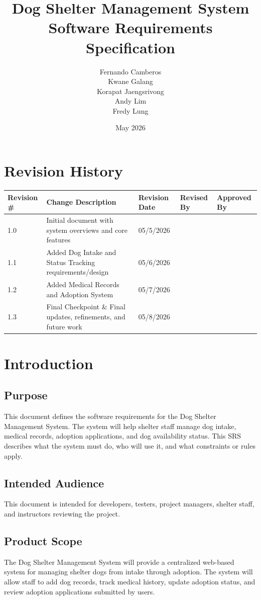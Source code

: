\documentclass[12pt]{article}
\title{Dog Shelter Management System\\Software Requirements Specification}
\author{Fernando Camberos\\Kwane Galang\\Korapat Jaengsrivong\\Andy Lim\\Fredy Lung}
\date{May 2026}
\begin{document}
\maketitle
\newpage
\tableofcontents
\section*{Revision History}
\begin{longtable}{|p{}|p{}|p{}|p{}|p{}|}
\hline
Revision \# & Change Description & Revision Date & Revised By & Approved By \\
\hline
1.0 & Initial document with system overviews and core features & 05/5/2026 &  &  \\
\hline
1.1 & Added Dog Intake and Status Tracking requirements/design & 05/6/2026 &  &  \\
\hline
1.2 & Added Medical Records and Adoption System & 05/7/2026 &  &  \\
\hline
1.3 & Final Checkpoint \& Final updates, refinements, and future work & 05/8/2026 &  &  \\
\hline
\end{longtable}
\newpage
\section{Introduction}
\subsection{Purpose}
This document defines the software requirements for the Dog Shelter Management System. The system will help shelter staff manage dog intake, medical records, adoption applications, and dog availability status. This SRS describes what the system must do, who will use it, and what constraints or rules apply.

\subsection{Intended Audience}
This document is intended for developers, testers, project managers, shelter staff, and instructors reviewing the project.

\subsection{Product Scope}
The Dog Shelter Management System will provide a centralized web-based system for managing shelter dogs from intake through adoption. The system will allow staff to add dog records, track medical history, update adoption status, and review adoption applications submitted by users.
\end{document}
